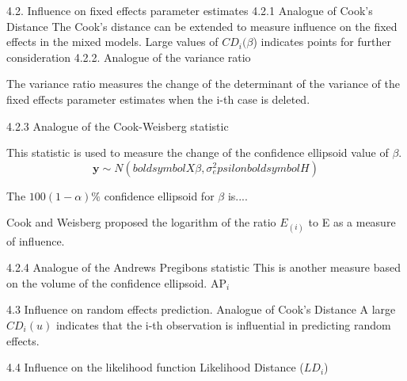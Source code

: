 \documentclass[12pt, a4paper]{article}
\begin{document}
4.2. Influence on fixed effects parameter estimates
4.2.1 Analogue of Cook’s Distance
The Cook’s distance can be extended to measure influence on the fixed effects in the mixed models.
Large values of $CD_i(\beta$) indicates points for further consideration
4.2.2. Analogue of the variance ratio

The variance ratio measures the change of the determinant of the variance of the fixed effects parameter estimates when the i-th case is deleted.

4.2.3 Analogue of the Cook-Weisberg statistic

This statistic is used to measure the change of the confidence ellipsoid value of $\beta$.
\[ \boldsymbol{y} \sim N ( boldsymbol{X}\beta , \sigma^2_epsilon boldsymbol{H})\]

The $100(1-\alpha)\%$ confidence ellipsoid for $\beta$ is....

Cook and Weisberg proposed the logarithm of the ratio $E_{(i)}$ to E as a measure of influence.




4.2.4 Analogue of the Andrews Pregibons statistic
This is another measure based on the volume of the confidence ellipsoid. AP$_i$

4.3 Influence on random effects prediction.
Analogue of Cook’s Distance
A large $CD_i(u)$ indicates that the i-th observation is influential in predicting random effects.

4.4 Influence on the likelihood function
Likelihood Distance ($LD_i$)
\end{document}
